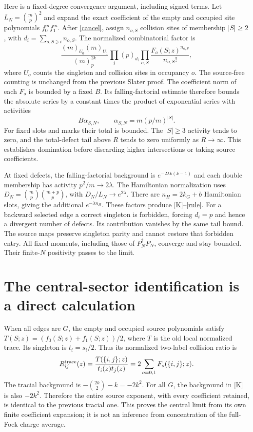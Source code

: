 \documentclass[11pt]{article}
\begin{document}
Here is a fixed-degree convergence argument, including signed terms.
Let $L_N=\binom mp^2$ and expand the exact coefficient of the empty
and occupied site polynomials $f_0^mf_1^m$. After \eqref{cancel},
assign $n_{o,S}$ collision sites of membership $|S|\ge2$, with
$d_i=\sum_{o,S\ni i}n_{o,S}$. The normalized combinatorial factor is
\begin{equation}\label{defect}
 \frac{(m)_{U_0}(m)_{U_1}}{(m)_p^{2k}}
 \prod_i(p)_{d_i}\prod_{o,S}
                   \frac{F_o(S;z)^{n_{o,S}}}{n_{o,S}!},
\end{equation}
where $U_o$ counts the singleton and collision sites in occupancy $o$.
The source-free counting is unchanged from the previous Slater proof.
The coefficient norm of each $F_o$ is bounded by a fixed $B$.
Its falling-factorial estimate therefore bounds the absolute series
by a constant times the product of exponential series with activities
\begin{equation}
 B\alpha_{S,N},\qquad \alpha_{S,N}=m(p/m)^{|S|}.
\end{equation}
For fixed slots and marks their total is bounded. The $|S|\ge3$
activity tends to zero, and the total-defect tail above $R$ tends to
zero uniformly as $R\to\infty$. This establishes domination before
discarding higher intersections or taking source coefficients.

At fixed defects, the falling-factorial background is
$e^{-2\lambda k(k-1)}$ and each double membership has activity
$p^2/m\to2\lambda$. The Hamiltonian normalization uses
$D_N=\binom mp\binom{m+p}p$, with $D_N/L_N\to e^{2\lambda}$.
There are $n_H=2k_G+b$ Hamiltonian slots, giving the additional
$e^{-\lambda n_H}$. These factors produce \eqref{K}--\eqref{rule}.
For a backward selected edge a correct singleton is forbidden,
forcing $d_i=p$ and hence a divergent number of defects. Its
contribution vanishes by the same tail bound. The source maps
preserve singleton parity and cannot restore that forbidden entry.
All fixed moments, including those of $P_N^\dagger P_N$, converge
and stay bounded. Their finite-$N$ positivity passes to the limit.

\newpage
\section{The central-sector identification is a direct calculation}
When all edges are $G$, the empty and occupied source polynomials
satisfy $T(S;z)=(f_0(S;z)+f_1(S;z))/2$, where $T$ is the old local
normalized trace. Its singleton is $t_i=s_i/2$. Thus its normalized
two-label collision ratio is
\begin{equation}\label{central}
 R_{ij}^{\rm trace}(z)=\frac{T(\{i,j\};z)}{t_i(z)t_j(z)}
   =2\sum_{o=0,1}F_o(\{i,j\};z).
\end{equation}
The tracial background is $-\binom{2k}{2}-k=-2k^2$.
For all $G$, the background in \eqref{K} is also $-2k^2$.
Therefore the entire source exponent, with every coefficient
retained, is identical to the previous tracial one. This proves
the central limit from its own finite coefficient expansion; it is
not an inference from concentration of the full-Fock charge average.
\end{document}

